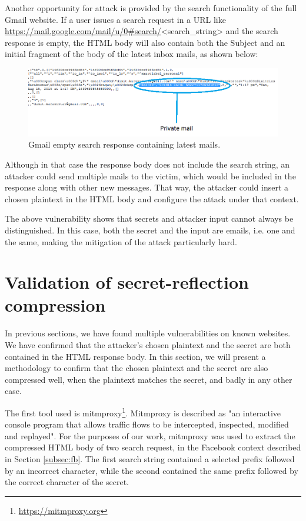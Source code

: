 Another opportunity for attack is provided by the search functionality of the
full Gmail website. If a user issues a search request in a URL like
\url{https://mail.google.com/mail/u/0#search/}<search\_string> and the search
response is empty, the HTML body will also contain both the Subject and an
initial fragment of the body of the latest inbox mails, as shown below:

\begin{figure}[H] \caption{Gmail empty search response containing latest mails.}
\centering
\includegraphics[width=1.1\textwidth]{diagrams/gmail_plain_response.png}\end{figure}

Although in that case the response body does not include the search string, an
attacker could send multiple mails to the victim, which would be included in the
response along with other new messages. That way, the attacker could insert a
chosen plaintext in the HTML body and configure the attack under that context.

The above vulnerability shows that secrets and attacker input cannot always be
distinguished. In this case, both the secret and the input are emails, i.e. one
and the same, making the mitigation of the attack particularly hard.

\section{Validation of secret-reflection compression}\label{sec:mitmproxy}

In previous sections, we have found multiple vulnerabilities on known websites.
We have confirmed that the attacker's chosen plaintext and the secret are both
contained in the HTML response body. In this section, we will present a
methodology to confirm that the chosen plaintext and the secret are also
compressed well, when the plaintext matches the secret, and badly in any other
case.

The first tool used is mitmproxy\footnote{\url{https://mitmproxy.org}}.
Mitmproxy is described as "an interactive console program that allows traffic
flows to be intercepted, inspected, modified and replayed". For the purposes of
our work, mitmproxy was used to extract the compressed HTML body of two search
request, in the Facebook context described in Section \ref{subsec:fb}. The first
search string contained a selected prefix followed by an incorrect character,
while the second contained the same prefix followed by the correct character of
the secret.


